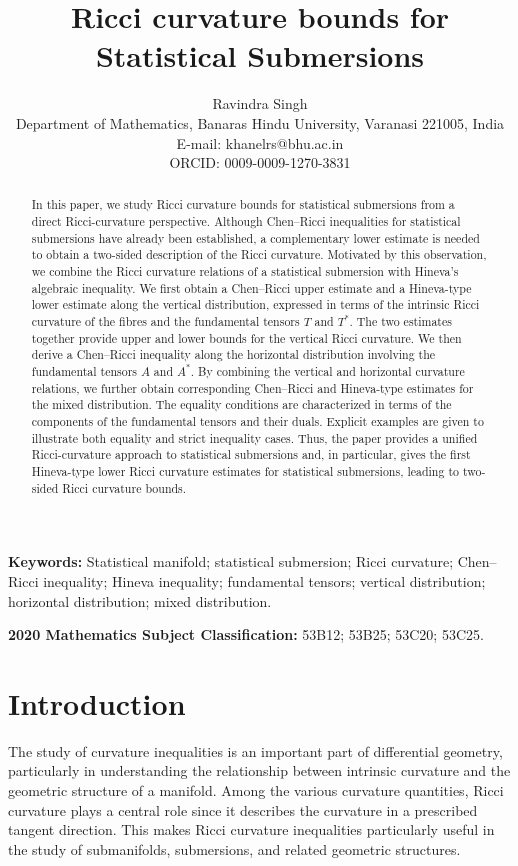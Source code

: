 \documentclass[10pt,a4paper]{article}
\title{\bfseries
Ricci curvature bounds for Statistical Submersions
}
\author{
Ravindra Singh
\\[2ex]
Department of Mathematics, Banaras Hindu University, Varanasi 221005, India\\
E-mail: khanelrs@bhu.ac.in\\
ORCID: 0009-0009-1270-3831
}
\date{}
\theoremstyle{definition}
\theoremstyle{remark}
\numberwithin{equation}{section}
\begin{document}
\maketitle

\begin{abstract}
In this paper, we study Ricci curvature bounds for statistical submersions
from a direct Ricci-curvature perspective. Although Chen--Ricci inequalities
for statistical submersions have already been established, a complementary
lower estimate is needed to obtain a two-sided description of the Ricci
curvature. Motivated by this observation, we combine the Ricci curvature
relations of a statistical submersion with Hineva's algebraic inequality.
We first obtain a Chen--Ricci upper estimate and a Hineva-type lower
estimate along the vertical distribution, expressed in terms of the
intrinsic Ricci curvature of the fibres and the fundamental tensors
$T$ and $T^{*}$. The two estimates together provide upper and lower
bounds for the vertical Ricci curvature. We then derive a Chen--Ricci
inequality along the horizontal distribution involving the fundamental
tensors $A$ and $A^{*}$. By combining the vertical and horizontal
curvature relations, we further obtain corresponding Chen--Ricci and
Hineva-type estimates for the mixed distribution. The equality conditions
are characterized in terms of the components of the fundamental tensors
and their duals. Explicit examples are given to illustrate both equality
and strict inequality cases. Thus, the paper provides a unified
Ricci-curvature approach to statistical submersions and, in particular,
gives the first Hineva-type lower Ricci curvature estimates for statistical
submersions, leading to two-sided Ricci curvature bounds.
\end{abstract}

\noindent
\textbf{Keywords:}
Statistical manifold; statistical submersion; Ricci curvature;
Chen--Ricci inequality; Hineva inequality; fundamental tensors;
vertical distribution; horizontal distribution; mixed distribution.

\noindent
\textbf{2020 Mathematics Subject Classification:}
53B12; 53B25; 53C20; 53C25.


\section{Introduction}

The study of curvature inequalities is an important part of differential
geometry, particularly in understanding the relationship between
intrinsic curvature and the geometric structure of a manifold. Among the
various curvature quantities, Ricci curvature plays a central role since
it describes the curvature in a prescribed tangent direction. This makes
Ricci curvature inequalities particularly useful in the study of
submanifolds, submersions, and related geometric structures.
\end{document}
